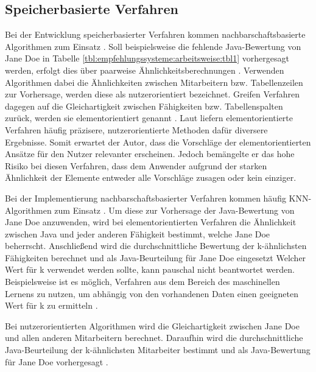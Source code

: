\subsection{Speicherbasierte Verfahren}
\label{ch:empfehlungssysteme:cf:speicherbasiert}
Bei der Entwicklung speicherbasierter Verfahren kommen nachbarschaftsbasierte Algorithmen zum Einsatz \cite[S. 29]{recommenderSystems:2016}. Soll beispielsweise die fehlende Java-Bewertung von Jane Doe in Tabelle \ref{tbl:empfehlungssysteme:arbeitsweise:tbl1} vorhergesagt werden, erfolgt dies über paarweise Ähnlichkeitsberechnungen \cite[S. 2f.]{bharti:2019}. Verwenden Algorithmen dabei die Ähnlichkeiten zwischen Mitarbeitern bzw. Tabellenzeilen zur Vorhersage, werden diese als nutzerorientiert bezeichnet. Greifen Verfahren dagegen auf die Gleichartigkeit zwischen Fähigkeiten bzw. Tabellenspalten zurück, werden sie elementorientiert genannt \cite[S. 1f.]{duong:2018}. Laut \textcite[S. 42]{recommenderSystems:2016} liefern elementorientierte Verfahren häufig präzisere, nutzerorientierte Methoden dafür diversere Ergebnisse. Somit erwartet der Autor, dass die Vorschläge der elementorientierten Ansätze für den Nutzer relevanter erscheinen. Jedoch bemängelte er das hohe Risiko bei diesen Verfahren, dass dem Anwender aufgrund der starken Ähnlichkeit der Elemente entweder alle Vorschläge zusagen oder kein einziger.

Bei der Implementierung nachbarschaftsbasierter Verfahren kommen häufig \ac{KNN}-Algorithmen zum Einsatz \cite[S. 1]{nayak:2018}. Um diese zur Vorhersage der Java-Bewertung von Jane Doe anzuwenden, wird bei elementorientierten Verfahren die Ähnlichkeit zwischen Java und jeder anderen Fähigkeit bestimmt, welche Jane Doe beherrscht. Anschließend wird die durchschnittliche Bewertung der k-ähnlichsten Fähigkeiten berechnet und als Java-Beurteilung für Jane Doe eingesetzt \cite[S. 2]{hao:2013} Welcher Wert für k verwendet werden sollte, kann pauschal nicht beantwortet werden. Beispielsweise ist es möglich, Verfahren aus dem Bereich des maschinellen Lernens zu nutzen, um abhängig von den vorhandenen Daten einen geeigneten Wert für k zu ermitteln \cite[S. 2f.]{jiang:2007}.

Bei nutzerorientierten Algorithmen wird die Gleichartigkeit zwischen Jane Doe und allen anderen Mitarbeitern berechnet. Daraufhin wird die durchschnittliche Java-Beurteilung der k-ähnlichsten Mitarbeiter bestimmt und als Java-Bewertung für Jane Doe vorhergesagt \cite[S. 2f.]{hao:2013}.

